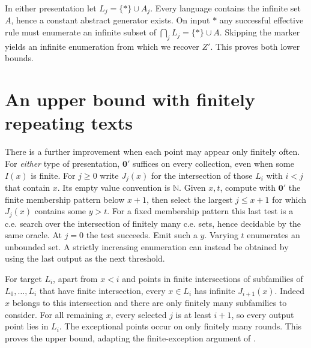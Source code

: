 \documentclass[11pt]{article}
\begin{document}
In either presentation let $L_j=\{*\}\cup A_j$. Every language contains the infinite set $A$, hence a constant abstract generator exists. On input $*$ any successful effective rule must enumerate an infinite subset of $\bigcap_j L_j=\{*\}\cup A$. Skipping the marker yields an infinite enumeration from which we recover $Z'$. This proves both lower bounds.

\section{An upper bound with finitely repeating texts}
There is a further improvement when each point may appear only finitely often. For \emph{either} type of presentation, $\mathbf 0'$ suffices on every collection, even when some $I(x)$ is finite. For $j\ge0$ write $J_j(x)$ for the intersection of those $L_i$ with $i<j$ that contain $x$. Its empty value convention is $\mathbb N$. Given $x,t$, compute with $\mathbf 0'$ the finite membership pattern below $x+1$, then select the largest $j\le x+1$ for which $J_j(x)$ contains some $y>t$. For a fixed membership pattern this last test is a c.e. search over the intersection of finitely many c.e. sets, hence decidable by the same oracle. At $j=0$ the test succeeds. Emit such a $y$. Varying $t$ enumerates an unbounded set. A strictly increasing enumeration can instead be obtained by using the last output as the next threshold.

For target $L_i$, apart from $x<i$ and points in finite intersections of subfamilies of $L_0,\ldots,L_i$ that have finite intersection, every $x\in L_i$ has infinite $J_{i+1}(x)$. Indeed $x$ belongs to this intersection and there are only finitely many subfamilies to consider. For all remaining $x$, every selected $j$ is at least $i+1$, so every output point lies in $L_i$. The exceptional points occur on only finitely many rounds. This proves the upper bound, adapting the finite-exception argument of \cite[Theorem 1.1]{kmsv}.
\end{document}
